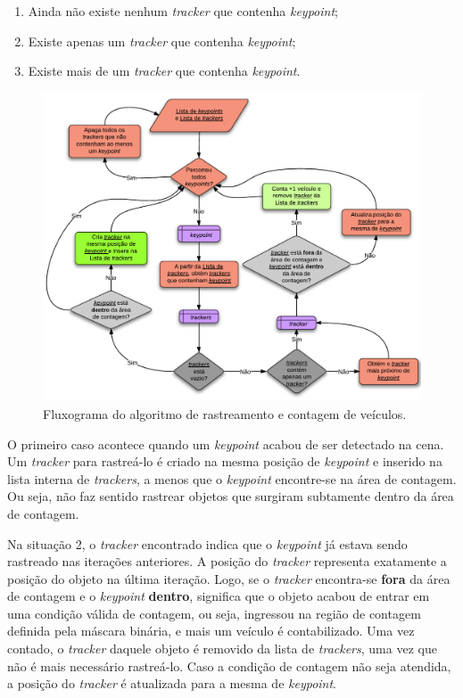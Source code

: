 \begin{enumerate}
  \item Ainda não existe nenhum \textit{tracker} que contenha \textit{keypoint};
  \item Existe apenas um \textit{tracker} que contenha \textit{keypoint};
  \item Existe mais de um \textit{tracker} que contenha \textit{keypoint}.
\end{enumerate}


\begin{figure}[ht]
  \begin{center}
    \includegraphics[scale=0.85]{imgs/fluxograma_contagem.pdf}
  \end{center}
  \caption{Fluxograma do algoritmo de rastreamento e contagem de veículos.}
  \label{fig:fluxograma_contagem}
\end{figure}

O primeiro caso acontece quando um \textit{keypoint} acabou de ser detectado na cena. Um \textit{tracker} para rastreá-lo é criado na mesma posição de \textit{keypoint} e inserido na lista interna de \textit{trackers}, a menos que o \textit{keypoint} encontre-se na área de contagem. Ou seja, não faz sentido rastrear objetos que surgiram subtamente dentro da área de contagem.

Na situação 2, o \textit{tracker} encontrado indica que o \textit{keypoint} já estava sendo rastreado nas iterações anteriores. A posição do \textit{tracker} representa exatamente a posição do objeto na última iteração. Logo, se o \textit{tracker} encontra-se \textbf{fora} da área de contagem e o \textit{keypoint} \textbf{dentro}, significa que o objeto acabou de entrar em uma condição válida de contagem, ou seja, ingressou na região de contagem definida pela máscara binária, e mais um veículo é contabilizado. Uma vez contado, o \textit{tracker} daquele objeto é removido da lista de \textit{trackers}, uma vez que não é mais necessário rastreá-lo. Caso a condição de contagem não seja atendida, a posição do \textit{tracker} é atualizada para a mesma de \textit{keypoint}.

